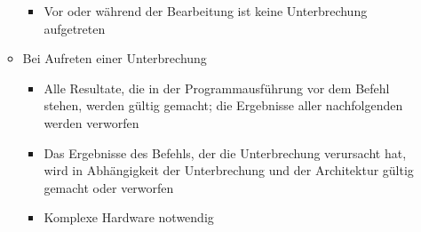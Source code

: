 \begin{itemize}
\begin{itemize}
\begin{itemize}
			\item Vor oder während der Bearbeitung ist keine Unterbrechung aufgetreten
		\end{itemize}
		\item Bei Aufreten einer Unterbrechung
		\begin{itemize}
			\item Alle Resultate, die in der Programmausführung vor dem Befehl stehen, werden gültig gemacht; die Ergebnisse aller nachfolgenden werden verworfen
			\item Das Ergebnisse des Befehls, der die Unterbrechung verursacht hat, wird in Abhängigkeit der Unterbrechung und der Architektur gültig gemacht oder verworfen
			\item Komplexe Hardware notwendig
		\end{itemize}
	\end{itemize}
\end{itemize}

